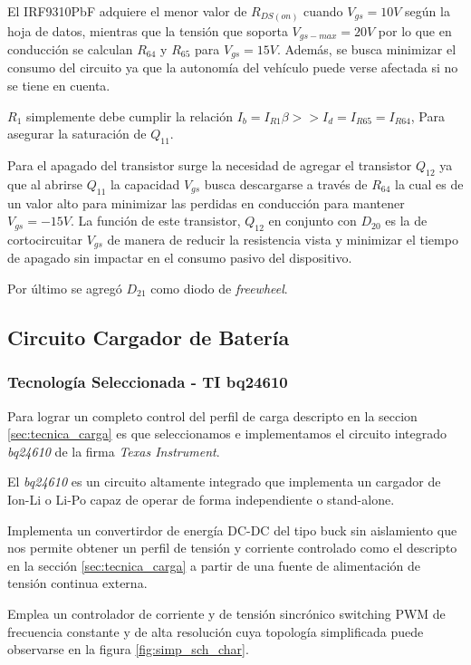 \documentclass[10pt,a4paper]{article}
\begin{document}
El IRF9310PbF adquiere el menor valor de $R_{DS(on)}$ cuando $V_{gs} = 10V$
según la hoja de datos\cite{IRF9310}, mientras que la tensión que soporta
$V_{gs-max}=20V$ por lo que en conducción se calculan $R_{64}$ y $R_{65}$ para
$V_{gs}=15V$.
Además, se busca minimizar el consumo del circuito ya que la autonomía del
vehículo puede verse afectada si no se tiene en cuenta.

$R_1$ simplemente debe cumplir la relación $I_b = I_{R1} \beta >> I_d = I_{R65}
= I_{R64}$, Para asegurar la saturación de $Q_{11}$. 

Para el apagado del transistor surge la necesidad de agregar el transistor
$Q_{12}$ ya que al abrirse $Q_{11}$ la capacidad $V_{gs}$ busca descargarse a
través de $R_{64}$ la cual es de un valor alto para minimizar las perdidas en
conducción para mantener $V_{gs}=-15V$. La función de este transistor, $Q_{12}$
en conjunto con $D_{20}$ es la de cortocircuitar $V_{gs}$ de manera de reducir
la resistencia vista y minimizar el tiempo de apagado sin impactar en el consumo
pasivo del dispositivo.

Por último se agregó $D_{21}$ como diodo de \emph{freewheel}.

\subsection{Circuito Cargador de Batería}

\subsubsection{Tecnología Seleccionada - TI bq24610}

Para lograr un completo control del perfil de carga descripto en la seccion
\ref{sec:tecnica_carga}  es que seleccionamos e implementamos el circuito
integrado \emph{bq24610} de la firma \emph{Texas Instrument}.

El \emph{bq24610} es un circuito altamente integrado que implementa un cargador
de \acrfull{Ion-Li} o \acrfull{Li-Po} capaz de operar de forma independiente o
stand-alone.

Implementa un convertirdor de energía DC-DC del tipo buck sin aislamiento que
nos permite obtener un perfil de tensión y corriente controlado como el
descripto en la sección \ref{sec:tecnica_carga} a partir de una fuente de
alimentación de tensión continua externa.

Emplea un controlador de corriente y de tensión sincrónico
switching PWM de frecuencia constante y de alta resolución cuya
topología simplificada puede observarse en la figura \ref{fig:simp_sch_char}. 
\end{document}
